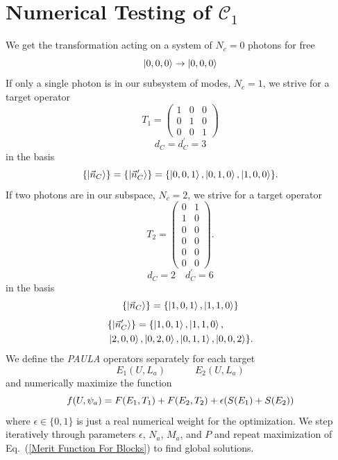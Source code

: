\documentclass[aps,pra,twocolumn,showpacs,superscriptaddress,floatfix,10pt]{revtex4}
\begin{document}
\section{Numerical Testing of $\mathcal{C}_1$}
\label{Section Numerical Testing}
We get the transformation acting on a system of $N_c=0$ photons for free
\begin{equation}
\label{Free Operation}
\ket{0,0,0} \rightarrow \ket{0,0,0}
\end{equation}
If only a single photon is in our subsystem of modes, $N_c=1$, we strive for a target operator
\begin{equation}
\label{T1 1C2T}
T_1=	\begin{pmatrix} 1 & 0 & 0  \\ 0 & 1 & 0  \\ 0 & 0 & 1   \end{pmatrix}  
\end{equation}
\begin{equation}
d_C = d_C^\prime = 3
\end{equation}
in the basis
\begin{equation}
\{ \ket{\vec{n}_C} \} = \{ \ket{\vec{n}_C^\prime} \} = \{ \ket{0,0,1},\ket{0,1,0},\ket{1,0,0} \}.
\end{equation}
If two photons are in our subspace, $N_c=2$, we strive for a target operator 
\begin{equation}
\label{T2 1C2T}
T_2=\begin{pmatrix} 0 & 1  \\ 1 & 0  \\ 0 & 0 \\ 0 & 0 \\ 0 & 0 \\ 0 & 0   \end{pmatrix}.  
\end{equation}
\begin{equation}
d_C = 2 \quad d_C^\prime = 6
\end{equation}
in the basis
\begin{equation}
\{ \ket{\vec{n}_C} \} = \{ \ket{1,0,1},\ket{1,1,0} \}
\end{equation}
\begin{eqnarray}
& \{ \ket{\vec{n}^\prime_C } \} = \{ \ket{1,0,1},\ket{1,1,0}, \\ &\ket{2,0,0},\ket{0,2,0},\ket{0,1,1},\ket{0,0,2} \}. \nonumber
\end{eqnarray}
We define the \textit{PAULA} operators separately for each target
\begin{equation}
E_1(U,L_a) \quad \quad \quad E_2(U,L_a)
\end{equation}
and numerically maximize the function
\begin{equation}
\label{Merit Function For Blocks}
\small f(U,\psi_a) = F(E_1,T_1) + F(E_2,T_2) +\epsilon (S(E_1) + S(E_2) )
\end{equation}
where $\epsilon \in \{0,1\}$ is just a real numerical weight for the optimization. We step iteratively through parameters $\epsilon$, $N_a$, $M_a$, and $P$ and repeat maximization of Eq.~(\ref{Merit Function For Blocks}) to find global solutions.
\end{document}
